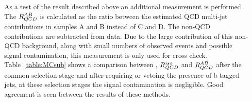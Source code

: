 
As a test of the result described above an additional measurement is performed.
The $R_{QCD}^{AB}$ is calculated as the ratio between the estimated QCD multi-jet contributions in samples A 
and B instead of C and D. The non-QCD contributions are subtracted from data. Due to the large contribution of this non-QCD background, 
along with small numbers of observed events and possible signal contamination, this measurement is only used for cross check. Table~\ref{table:MCsub} shows 
a comparison between \rqcd, $R_{QCD}^{iso}$ and $R_{QCD}^{AB}$ after the common selection stage and after requiring
or vetoing the presence of b-tagged jets,  at these selection stages the signal contamination is negligible. 
Good agreement is seen between the results of these methods. 



